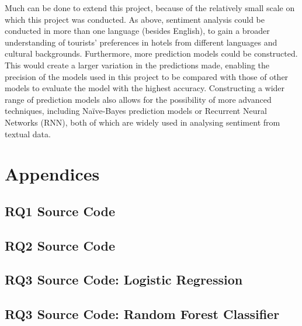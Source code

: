 \documentclass[12pt,bibliography=totocnumbered]{scrartcl}
\begin{document}
{Much can be done to extend this project, because of the relatively small scale on which this project
was conducted. As above, sentiment analysis could be conducted in more than one language (besides English),
to gain a broader understanding of tourists' preferences in hotels from different languages and cultural
backgrounds. Furthermore, more prediction models could be constructed. This would create a larger
variation in the predictions made, enabling the precision of the models used in this project to be
compared with those of other models to evaluate the model with the highest accuracy. Constructing a
wider range of prediction models also allows for the possibility of more advanced techniques,
including Naïve-Bayes prediction models or Recurrent Neural Networks (RNN), both of which are
widely used in analysing sentiment from textual data.

\printbibliography
}

\section{Appendices}

\subsection{RQ1 Source Code}

\subsection{RQ2 Source Code}

\subsection{RQ3 Source Code: Logistic Regression}

\subsection{RQ3 Source Code: Random Forest Classifier}
\end{document}
